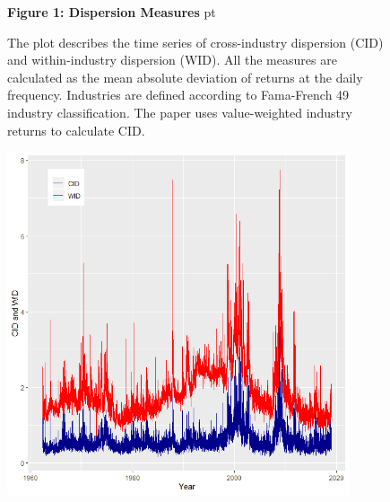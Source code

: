 \documentclass[12pt]{article}
\begin{document}
\begin{figure}[h!]
\textbf{Figure 1: Dispersion Measures}
 pt
\begin{flushleft}
{The plot describes the time series of cross-industry dispersion (CID) and within-industry dispersion (WID). All the measures are calculated as the mean absolute deviation of returns at the daily frequency. Industries are defined according to Fama-French 49 industry classification. The paper uses value-weighted industry returns to calculate CID.}
\end{flushleft}
\centering
\vspace{0.64cm}
\includegraphics[width=0.9\textwidth]{paper_b3/Figure1.png}
\end{figure}
\end{document}
